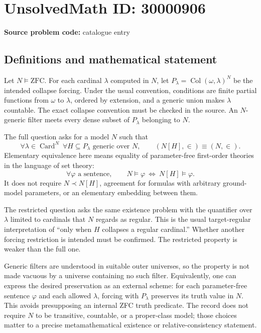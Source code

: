 \documentclass[11pt]{article}
\begin{document}
\section*{UnsolvedMath ID: 30000906}
\textbf{Source problem code:} catalogue entry
\subsection{Definitions and mathematical statement}
Let \(N\models\mathrm{ZFC}\). For each cardinal \(\lambda\) computed in \(N\), let \(P_\lambda=\operatorname{Col}(\omega,\lambda)^N\) be the intended collapse forcing. Under the usual convention, conditions are finite partial functions from \(\omega\) to \(\lambda\), ordered by extension, and a generic union makes \(\lambda\) countable. The exact collapse convention must be checked in the source. An \(N\)-generic filter meets every dense subset of \(P_\lambda\) belonging to \(N\).

The full question asks for a model \(N\) such that
\[
 \forall\lambda\in\operatorname{Card}^N\ \forall H\subseteq P_\lambda
 \text{ generic over }N,\qquad
 (N[H],\in)\equiv(N,\in).
\]
Elementary equivalence here means equality of parameter-free first-order theories in the language of set theory:
\[
 \forall\varphi\text{ a sentence},\qquad
 N\models\varphi\ \Longleftrightarrow\ N[H]\models\varphi.
\]
It does not require \(N\prec N[H]\), agreement for formulas with arbitrary ground-model parameters, or an elementary embedding between them.

The restricted question asks the same existence problem with the quantifier over \(\lambda\) limited to cardinals that \(N\) regards as regular. This is the usual target-regular interpretation of ``only when \(H\) collapses a regular cardinal.'' Whether another forcing restriction is intended must be confirmed. The restricted property is weaker than the full one.

Generic filters are understood in suitable outer universes, so the property is not made vacuous by a universe containing no such filter. Equivalently, one can express the desired preservation as an external scheme: for each parameter-free sentence \(\varphi\) and each allowed \(\lambda\), forcing with \(P_\lambda\) preserves its truth value in \(N\). This avoids presupposing an internal ZFC truth predicate. The record does not require \(N\) to be transitive, countable, or a proper-class model; those choices matter to a precise metamathematical existence or relative-consistency statement.
\end{document}
